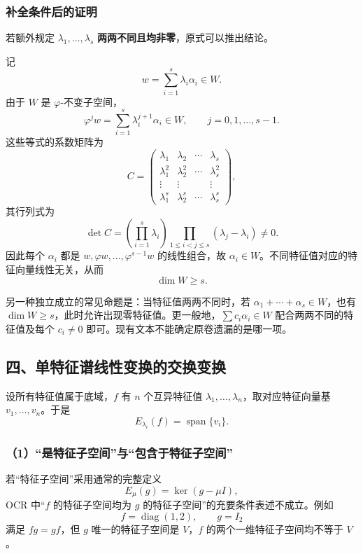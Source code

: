 \documentclass[11pt,fontset=fandol]{ctexart}
\begin{document}
\subsubsection{补全条件后的证明}\label{ux8865ux5168ux6761ux4ef6ux540eux7684ux8bc1ux660e}

若额外规定 \(\lambda_1,\ldots,\lambda_s\)
\textbf{两两不同且均非零}，原式可以推出结论。

记 \[
w=\sum_{i=1}^s\lambda_i\alpha_i\in W.
\] 由于 \(W\) 是 \(\varphi\)-不变子空间， \[
\varphi^jw=\sum_{i=1}^s\lambda_i^{j+1}\alpha_i\in W,
\qquad j=0,1,\ldots,s-1.
\] 这些等式的系数矩阵为 \[
C=\begin{pmatrix}
\lambda_1&\lambda_2&\cdots&\lambda_s\\
\lambda_1^2&\lambda_2^2&\cdots&\lambda_s^2\\
\vdots&\vdots&&\vdots\\
\lambda_1^s&\lambda_2^s&\cdots&\lambda_s^s
\end{pmatrix},
\] 其行列式为 \[
\det C=\left(\prod_{i=1}^s\lambda_i\right)
\prod_{1\leq i<j\leq s}(\lambda_j-\lambda_i)\neq0.
\] 因此每个 \(\alpha_i\) 都是 \(w,\varphi w,\ldots,\varphi^{s-1}w\)
的线性组合，故 \(\alpha_i\in W\)。不同特征值对应的特征向量线性无关，从而
\[
\boxed{\dim W\geq s.}
\]

另一种独立成立的常见命题是：当特征值两两不同时，若
\(\alpha_1+\cdots+\alpha_s\in W\)，也有
\(\dim W\geq s\)，此时允许出现零特征值。更一般地，\(\sum c_i\alpha_i\in W\)
配合两两不同的特征值及每个 \(c_i\neq0\)
即可。现有文本不能确定原卷遗漏的是哪一项。

\subsection{四、单特征谱线性变换的交换变换}\label{ux56dbux5355ux7279ux5f81ux8c31ux7ebfux6027ux53d8ux6362ux7684ux4ea4ux6362ux53d8ux6362}

设所有特征值属于底域，\(f\) 有 \(n\) 个互异特征值
\(\lambda_1,\ldots,\lambda_n\)，取对应特征向量基
\(v_1,\ldots,v_n\)。于是 \[
E_{\lambda_i}(f)=\operatorname{span}\{v_i\}.
\]

\subsubsection{（1）``是特征子空间''与``包含于特征子空间''}\label{ux662fux7279ux5f81ux5b50ux7a7aux95f4ux4e0eux5305ux542bux4e8eux7279ux5f81ux5b50ux7a7aux95f4}

若``特征子空间''采用通常的完整定义 \[
E_\mu(g)=\ker(g-\mu I),
\] OCR 中``\(f\) 的特征子空间均为 \(g\)
的特征子空间''的充要条件表述不成立。例如 \[
f=\operatorname{diag}(1,2),\qquad g=I_2
\] 满足 \(fg=gf\)，但 \(g\) 唯一的特征子空间是 \(V\)，\(f\)
的两个一维特征子空间均不等于 \(V\)。
\end{document}
